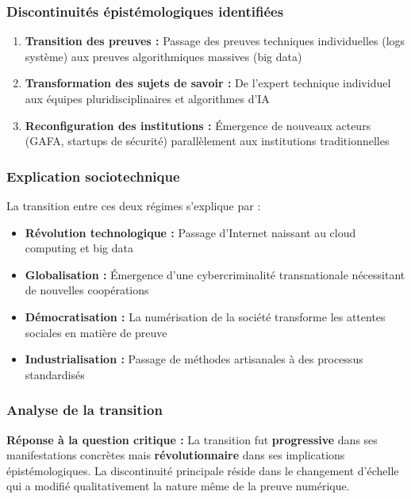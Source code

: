 \documentclass[12pt,a4paper]{article}
\begin{document}
\subsubsection{Discontinuités épistémologiques identifiées}

\begin{enumerate}
\item \textbf{Transition des preuves :} Passage des preuves techniques individuelles (logs système) aux preuves algorithmiques massives (big data)
\item \textbf{Transformation des sujets de savoir :} De l'expert technique individuel aux équipes pluridisciplinaires et algorithmes d'IA
\item \textbf{Reconfiguration des institutions :} Émergence de nouveaux acteurs (GAFA, startups de sécurité) parallèlement aux institutions traditionnelles
\end{enumerate}

\subsubsection{Explication sociotechnique}

La transition entre ces deux régimes s'explique par :

\begin{itemize}
\item \textbf{Révolution technologique :} Passage d'Internet naissant au cloud computing et big data
\item \textbf{Globalisation :} Émergence d'une cybercriminalité transnationale nécessitant de nouvelles coopérations
\item \textbf{Démocratisation :} La numérisation de la société transforme les attentes sociales en matière de preuve
\item \textbf{Industrialisation :} Passage de méthodes artisanales à des processus standardisés
\end{itemize}

\subsubsection{Analyse de la transition}

\textbf{Réponse à la question critique :} La transition fut \textbf{progressive} dans ses manifestations concrètes mais \textbf{révolutionnaire} dans ses implications épistémologiques. La discontinuité principale réside dans le changement d'échelle qui a modifié qualitativement la nature même de la preuve numérique.
\end{document}
